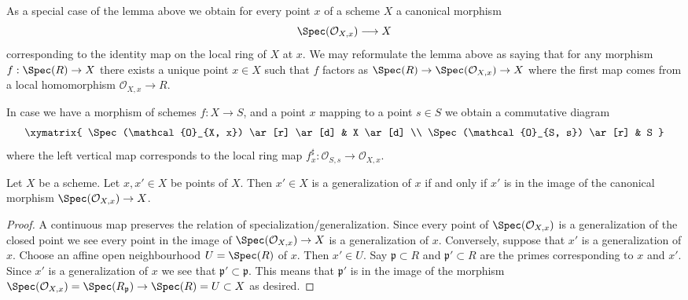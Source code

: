 \noindent
As a special case of the lemma above we obtain for every
point $x$ of a scheme $X$ a canonical morphism
\begin{equation}
\label{equation-canonical-morphism}
\Spec(\mathcal{O}_{X, x}) \longrightarrow X
\end{equation}
corresponding to the identity map on the local ring of $X$ at $x$.
We may reformulate the lemma above as saying that for any
morphism $f : \Spec(R) \to X$ there exists a unique point
$x \in X$ such that $f$ factors as
$\Spec(R) \to \Spec(\mathcal{O}_{X, x}) \to X$
where the first map comes from a local homomorphism
$\mathcal{O}_{X, x} \to R$.

\medskip\noindent
In case we have a morphism of schemes $f : X \to S$,
and a point $x$ mapping to a point $s \in S$ we obtain
a commutative diagram
$$
\xymatrix{
\Spec(\mathcal{O}_{X, x}) \ar[r] \ar[d] & X \ar[d] \\
\Spec(\mathcal{O}_{S, s}) \ar[r] & S
}
$$
where the left vertical map corresponds to the local ring map
$f^\sharp_x : \mathcal{O}_{S, s} \to \mathcal{O}_{X, x}$.

\begin{lemma}
\label{lemma-specialize-points}
Let $X$ be a scheme.
Let $x, x' \in X$ be points of $X$.
Then $x' \in X$ is a generalization of $x$ if and only if
$x'$ is in the image of the canonical morphism
$\Spec(\mathcal{O}_{X, x}) \to X$.
\end{lemma}

\begin{proof}
A continuous map preserves the relation of specialization/generalization.
Since every point of $\Spec(\mathcal{O}_{X, x})$ is a
generalization of the closed point we see every point in the image
of $\Spec(\mathcal{O}_{X, x}) \to X$ is a generalization of $x$.
Conversely, suppose that $x'$ is a generalization of $x$.
Choose an affine open neighbourhood $U = \Spec(R)$ of
$x$. Then $x' \in U$. Say $\mathfrak p \subset R$ and
$\mathfrak p' \subset R$ are the primes corresponding
to $x$ and $x'$. Since $x'$ is a generalization of $x$
we see that $\mathfrak p' \subset \mathfrak p$. This means
that $\mathfrak p'$ is in the image of the morphism
$\Spec(\mathcal{O}_{X, x}) = \Spec(R_{\mathfrak p})
\to \Spec(R) = U \subset X$ as desired.
\end{proof}

